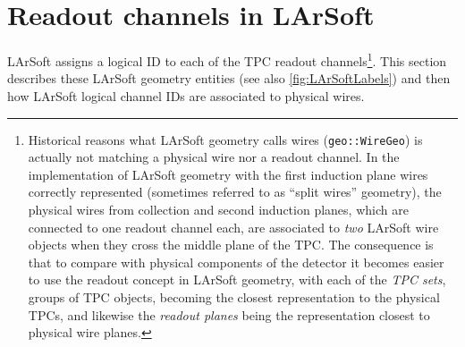 \section{Readout channels in LArSoft}
\label{sec:LArSoft}

LArSoft assigns a logical ID to each of the TPC readout channels\footnote{
Historical reasons what LArSoft geometry calls wires
(\texttt{geo::WireGeo}) is actually not matching a physical wire nor a readout
channel. In the implementation of LArSoft geometry with the first induction
plane wires correctly represented
(sometimes referred to as ``split wires'' geometry),
the physical wires from collection and
second induction planes, which are connected to one readout channel each,
are associated to \emph{two} LArSoft wire objects when they cross the middle
plane of the TPC.
The consequence is that to compare with physical components of the detector
it becomes easier to use the readout concept in LArSoft geometry,
with each of the \emph{TPC sets}, groups of TPC objects, becoming the closest
representation to the physical TPCs, and likewise the \emph{readout planes} being
the representation closest to physical wire planes.}.
This section describes these LArSoft geometry entities (see also \cref{fig:LArSoftLabels})
and then how LArSoft logical channel IDs are associated to physical wires.
